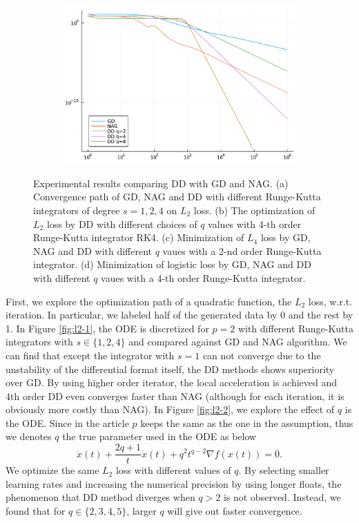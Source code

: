 \begin{figure}[htbp]
\begin{subfigure}{0.45\textwidth}
        \caption{}
        \label{l4}
    \end{subfigure}
    \hfill
    \begin{subfigure}{0.45\textwidth}
        \includegraphics[width=\textwidth]{"assets/logistic.pdf"}
        \caption{}
        \label{fig:logistic}
    \end{subfigure}
    \caption{Experimental results comparing DD with GD and NAG. (a) Convergence path of GD, NAG and DD with different Runge-Kutta integrators of degree $s=1, 2, 4$ on $L_2$ loss. (b) The optimization of $L_2$ loss by DD with different choices of $q$ values with 4-th order Runge-Kutta integrator RK4. (c) Minimization of $L_4$ loss by GD, NAG and DD with different $q$ vaues with a 2-nd order Runge-Kutta integrator. (d) Minimization of logistic loss by GD, NAG and DD with different $q$ vaues with a 4-th order Runge-Kutta integrator.}
    \label{Numerical}
\end{figure}

First, we explore the optimization path of a quadratic function, the $L_2$ loss, w.r.t. iteration. In particular, we labeled half of the generated data by 0 and the rest by 1. In Figure \ref{fig:l2-1}, the ODE is discretized for $p=2$ with different Runge-Kutta integrators with $s \in \{ 1,2,4 \}$ and compared against GD and NAG algorithm. We can find that except the integrator with $s=1$ can not converge due to the unstability of the differential format itself, the DD methods shows superiority over GD. By using higher order iterator, the local acceleration is achieved and 4th order DD even converges faster than NAG (although for each iteration, it is obviously more costly than NAG). In Figure \ref{fig:l2-2}, we explore the effect of $q$ is the ODE. Since in the article $p$ keeps the same as the one in the assumption, thus we denotes $q$ the true parameter used in the ODE as below
$$
    \ddot x(t) + \frac{2q+1}{t}\dot x(t)+q^2 t^{q-2}\nabla  f(x(t)) = 0.
$$
We optimize the same $L_2$ loss with different values of $q$. By selecting smaller learning rates and increasing the numerical precision by using longer floats, the phenomenon that DD method diverges when $q>2$ is not observed. Instead, we found that for $q \in \{ 2,3,4,5 \}$, larger $q$ will give out faster convergence.

